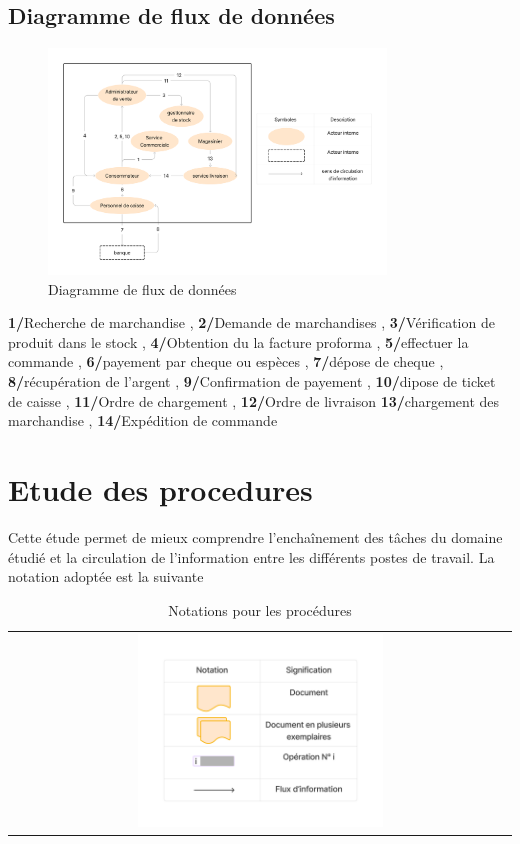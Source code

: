 \documentclass[edit,12pt,a4paper,ChapStyle,oneside,doubleinterligne]{report}
\begin{document}
\subsection{Diagramme de flux de données}
\begin{figure}[h!]\label{fig:flux}
\centering
\includegraphics[width=0.8\textwidth]{images/Diagramme de flux.png}
\caption{Diagramme de flux de données}
\end{figure}
\textbf{1/}Recherche de marchandise , \textbf{2/}Demande de marchandises , \textbf{3/}Vérification de produit dans le stock , 
\textbf{4/}Obtention du la facture proforma , \textbf{5/}effectuer la commande , \textbf{6/}payement par cheque ou espèces
 , \textbf{7/}dépose de cheque , \textbf{8/}récupération de l’argent , \textbf{9/}Confirmation de payement
  , \textbf{10/}dipose de ticket de caisse , \textbf{11/}Ordre de chargement , \textbf{12/}Ordre de livraison
 \textbf{13/}chargement des marchandise , \textbf{14/}Expédition de commande

\section{Etude des procedures}
Cette étude permet de mieux comprendre l’enchaînement des tâches du domaine étudié et la circulation de l’information entre les différents postes de travail.
\newline La notation adoptée est la suivante
\begin{table}[h!]
    \centering
    \begin{tabular}{c}
        \centering
        \includegraphics[width=0.5\textwidth]{images/description procedures.png}
    \end{tabular}
    \caption{Notations pour les procédures}
    \label{tab:Notations pour les procédures}
\end{table}
\end{document}
